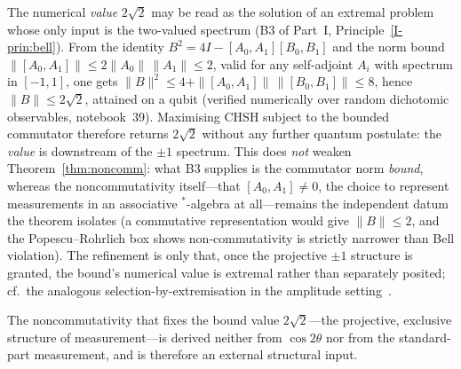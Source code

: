 \documentclass[11pt]{article}
\begin{document}
\begin{remark}\label{rem:extremal-2sqrt2}
The numerical \emph{value} $2\sqrt2$ may be read as the solution of an extremal problem whose
only input is the two-valued spectrum (B3 of Part~I, Principle~\ref{I-prin:bell}). From the
identity $B^2=4I-[A_0,A_1][B_0,B_1]$ and the norm bound
$\|[A_0,A_1]\|\le2\|A_0\|\,\|A_1\|\le2$, valid for any self-adjoint $A_i$ with spectrum in
$[-1,1]$, one gets $\|B\|^2\le4+\|[A_0,A_1]\|\,\|[B_0,B_1]\|\le8$, hence $\|B\|\le2\sqrt2$,
attained on a qubit (verified numerically over random dichotomic observables, notebook~39).
Maximising CHSH subject to the bounded commutator therefore returns $2\sqrt2$ without any
further quantum postulate: the \emph{value} is downstream of the $\pm1$ spectrum. This does
\emph{not} weaken Theorem~\ref{thm:noncomm}: what B3 supplies is the commutator norm
\emph{bound}, whereas the noncommutativity itself---that $[A_0,A_1]\neq0$, the choice to
represent measurements in an associative ${}^{*}$-algebra at all---remains the independent
datum the theorem isolates (a commutative representation would give $\|B\|\le2$, and the
Popescu--Rohrlich box shows non-commutativity is strictly narrower than Bell violation). The
refinement is only that, once the projective $\pm1$ structure is granted, the bound's numerical
value is extremal rather than separately posited; cf.\ the analogous selection-by-extremisation
in the amplitude setting~\cite{cheung2025}.
\end{remark}

\begin{theorem}\label{thm:noncomm}
The noncommutativity that fixes the bound value $2\sqrt2$---the projective, exclusive structure
of measurement---is derived neither from $\cos2\theta$ nor from the standard-part measurement,
and is therefore an external structural input.
\end{theorem}
\end{document}

